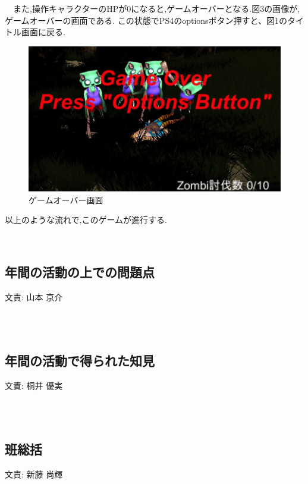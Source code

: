 \documentclass[a4paper]{jarticle}
\newcommand{\resp}[1]{\begin{flushright}文責: #1\end{flushright}~\\　}
\begin{document}
        　また,操作キャラクターのHPが0になると,ゲームオーバーとなる.図3の画像が,ゲームオーバーの画面である.
         この状態でPS4のoptionsボタン押すと、図1のタイトル画面に戻る.\\
        \begin{figure}[h]
          \centering
          \includegraphics[keepaspectratio, scale=0.5]
               {images/Shindo/gameover.JPG}
          \caption{ゲームオーバー画面}
         \end{figure}
         以上のような流れで,このゲームが進行する.
        
        

　\subsection{年間の活動の上での問題点}
      \resp{山本 京介}
     
    \subsection{年間の活動で得られた知見}
      \resp{桐井 優実}

    \subsection{班総括}
      \resp{新藤 尚輝}
  
\end{document}
